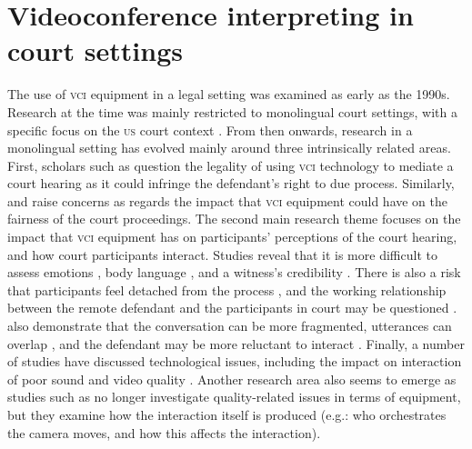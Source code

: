 \documentclass[output=paper]{langsci/langscibook}
\begin{document}
\section{Videoconference interpreting in court settings}
\label{sec:devaux:2}
The use of \textsc{vci} equipment in a legal setting was examined as early as the 1990s. Research at the time was mainly restricted to monolingual court settings, with a specific focus on the \textsc{us} court context \citep{Radburn-Remfry1994,Thaxton1993}. From then onwards, research in a monolingual setting has evolved mainly around three intrinsically related areas. First, scholars such as \citet{Johnson2006} question the legality of using \textsc{vci} technology to mediate a court hearing as it could infringe the defendant’s right to due process. Similarly, \citet{Radburn-Remfry1994} and \citet{Thaxton1993} raise concerns as regards the impact that \textsc{vci} equipment could have on the fairness of the court proceedings. The second main research theme focuses on the impact that \textsc{vci} equipment has on participants’ perceptions of the court hearing, and how court participants interact. Studies reveal that it is more difficult to assess emotions \citep{Radburn-Remfry1994}, body language \citep{Fullwood2008}, and a witness’s credibility \citep{Roth2000}. There is also a risk that participants feel detached from the process \citep{McKay2016}, and the working relationship between the remote defendant and the participants in court may be questioned \citep{Hodges2008}. \citet{Verdier2011} also demonstrate that the conversation can be more fragmented, utterances can overlap \citep{Licoppe2015}, and the defendant may be more reluctant to interact \citep{Licoppe2014}. Finally, a number of studies have discussed technological issues, including the impact on interaction of poor sound and video quality \citep{Haas2006, Plotnikoff2000}. Another research area also seems to emerge as studies such as \citet{Licoppe2013} no longer investigate quality-related issues in terms of equipment, but they examine how the interaction itself is produced (e.g.: who orchestrates the camera moves, and how this affects the interaction). 
\end{document}
